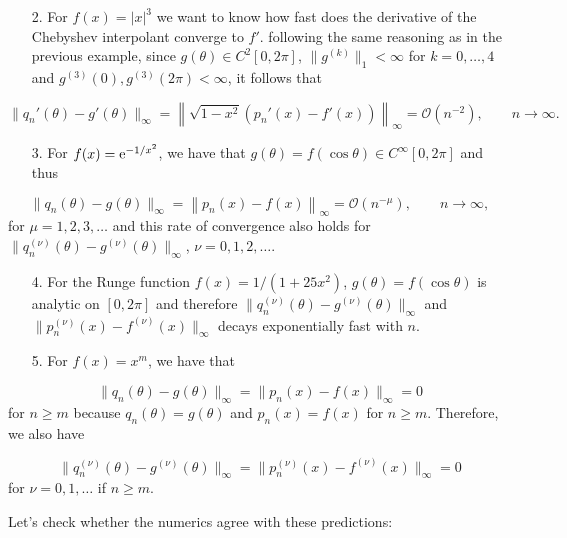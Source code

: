 \documentclass[12pt,a4paper]{article}
\begin{document}
\begin{itemize}
\item[2. ] For $f(x) = \vert x \vert^3$ we want to know how fast does the derivative of the Chebyshev interpolant converge to $f'$.  following the same reasoning as in the previous example, since $g(\theta) \in C^{2}[0, 2\pi]$, $\| g^{(k)}\|_1 < \infty$ for $k = 0, \ldots, 4$ and $g^{(3)}(0), g^{(3)}(2\pi) < \infty$, it follows that

\end{itemize}
\[
\| q_n'(\theta) - g'(\theta) \|_{\infty} = \left\|\sqrt{1-x^2}( p_n'(x) - f'(x)) \right\|_{\infty} = \mathcal{O}\left( n^{-2} \right), \qquad n \to \infty.
\]
\begin{itemize}
\item[3. ] For $f(x) = {\rm e}^{-1/x^2}$, we have that $g(\theta) = f(\cos\theta) \in C^{\infty}[0, 2\pi]$ and thus

\end{itemize}
\[
\| q_n(\theta) - g(\theta) \|_{\infty} = \left\| p_n(x) - f(x) \right\|_{\infty} = \mathcal{O}\left( n^{-\mu} \right), \qquad n \to \infty, 
\]
for $\mu = 1, 2, 3, \ldots$ and this rate of convergence also holds for $\| q_n^{(\nu)}(\theta) - g^{(\nu)}(\theta) \|_{\infty}$, $\nu = 0, 1, 2, \ldots$.

\begin{itemize}
\item[4. ] For the Runge function $f(x) = 1/(1 + 25x^2)$,  $g(\theta) = f(\cos\theta)$ is analytic on $[0, 2\pi]$ and therefore $\| q_n^{(\nu)}(\theta) - g^{(\nu)}(\theta) \|_{\infty}$ and $\| p_n^{(\nu)}(x) - f^{(\nu)}(x) \|_{\infty}$ decays exponentially fast with $n$. 


\item[5. ] For $f(x) = x^{m}$, we have that

\end{itemize}
\[
\| q_n(\theta) - g(\theta) \|_{\infty} = \| p_n(x) - f(x) \|_{\infty} = 0
\]
for $n \geq m$ because $q_n(\theta) = g(\theta)$ and $p_n(x) = f(x)$ for $n \geq m$.  Therefore, we also have  

\[
\| q_n^{(\nu)}(\theta) - g^{(\nu)}(\theta) \|_{\infty} = \| p_n^{(\nu)}(x) - f^{(\nu)}(x) \|_{\infty} = 0
\]
for $\nu = 0, 1, \ldots$ if $n \geq m$.

Let's check whether the numerics agree with these predictions:
\end{document}
